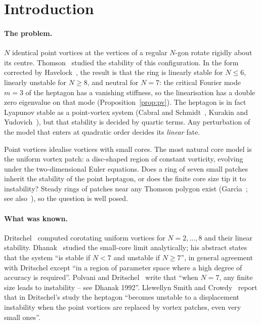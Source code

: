 \documentclass[11pt]{article}
\theoremstyle{definition}
\theoremstyle{remark}
\begin{document}
\section{Introduction}

\paragraph{The problem.} $N$ identical point vortices at the vertices of a regular $N$-gon rotate rigidly about its
centre. Thomson~\cite{Thomson1883} studied the stability of this configuration. In the form corrected by
Havelock~\cite{Havelock1931}, the result is that the ring is linearly stable for $N\le6$, linearly unstable for $N\ge8$, and
neutral for $N=7$: the critical Fourier mode $m=3$ of the heptagon has a vanishing stiffness, so the linearisation has a
double zero eigenvalue on that mode (Proposition~\ref{prop:pv}). The heptagon is in fact Lyapunov stable as a point-vortex
system (Cabral and Schmidt~\cite{CabralSchmidt1999}, Kurakin and Yudovich~\cite{KurakinYudovich2002}), but that stability
is decided by quartic terms. Any perturbation of the model that enters at quadratic order decides its \emph{linear} fate.

Point vortices idealise vortices with small cores. The most natural core model is the uniform vortex patch: a
disc-shaped region of constant vorticity, evolving under the two-dimensional Euler equations. Does a ring of seven small
patches inherit the stability of the point heptagon, or does the finite core size tip it to instability? Steady rings of
patches near any Thomson polygon exist (Garc\'\i a~\cite{Garcia2021}; see also~\cite{HmidiMateu2017,HassainiaWheeler2022}),
so the question is well posed.

\paragraph{What was known.} Dritschel~\cite{Dritschel1985} computed corotating uniform vortices for $N=2,\dots,8$ and their
linear stability. Dhanak~\cite{Dhanak1992} studied the small-core limit analytically; his abstract states that the system
``is stable if $N<7$ and unstable if $N\ge7$'', in general agreement with Dritschel except ``in a region of parameter space
where a high degree of accuracy is required''. Polvani and Dritschel~\cite[p.~52]{PolvaniDritschel1993} write that ``when
$N=7$, any finite size leads to instability -- see Dhanak 1992''. Llewellyn Smith and Crowdy~\cite{LlewellynSmithCrowdy2012}
report that in Dritschel's study the heptagon ``becomes unstable to a displacement instability when the point vortices are
replaced by vortex patches, even very small ones''.
\end{document}
